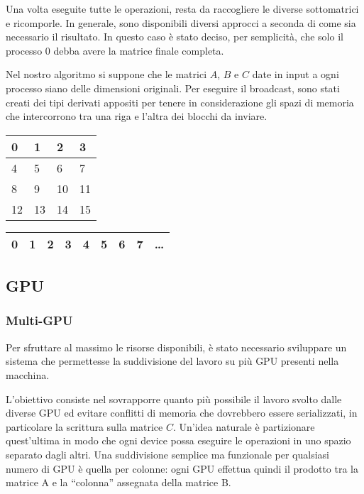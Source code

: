 \documentclass[a4paper]{article}
\begin{document}
Una volta eseguite tutte le operazioni, resta da raccogliere le diverse sottomatrici e ricomporle. In generale, sono disponibili diversi approcci a seconda di come sia necessario il risultato. In questo caso è stato deciso, per semplicità, che solo il processo 0 debba avere la matrice finale completa.

Nel nostro algoritmo si suppone che le matrici $A$, $B$ e $C$ date in input a ogni processo siano delle dimensioni originali. Per eseguire il broadcast, sono stati creati dei tipi derivati appositi per tenere in considerazione gli spazi di memoria che intercorrono tra una riga e l'altra dei blocchi da inviare.
\begin{table}[h]
    \center
    \begin{tabular}{|l|l|l|l|}
        \hline
        \cellcolor{yellow}0 & \cellcolor{yellow}1 & 2  & 3  \\ \hline
        \cellcolor{yellow}4 & \cellcolor{yellow}5 & 6  & 7  \\ \hline
        8                   & 9                   & 10 & 11 \\ \hline
        12                  & 13                  & 14 & 15 \\ \hline
    \end{tabular}
    \begin{tabular}{|l|l|l|l|l|l|l|l|l}
        \hline
        \cellcolor{yellow}0 & \cellcolor{yellow}1 & 2 & 3 & \cellcolor{yellow}4 & \cellcolor{yellow}5 & 6 & 7 & \dots \\ \hline
    \end{tabular}
\end{table}

\subsection{GPU}
\subsubsection{Multi-GPU}
Per sfruttare al massimo le risorse disponibili, è stato necessario sviluppare un sistema che permettesse la suddivisione del lavoro su più GPU presenti nella macchina.

L'obiettivo consiste nel sovrapporre quanto più possibile il lavoro svolto dalle diverse GPU ed evitare conflitti di memoria che dovrebbero essere serializzati, in particolare la scrittura sulla matrice $C$. Un'idea naturale è partizionare quest'ultima in modo che ogni device possa eseguire le operazioni in uno spazio separato dagli altri.
Una suddivisione semplice ma funzionale per qualsiasi numero di GPU è quella per colonne: ogni GPU effettua quindi il prodotto tra la matrice A e la ``colonna'' assegnata della matrice B.
\end{document}

